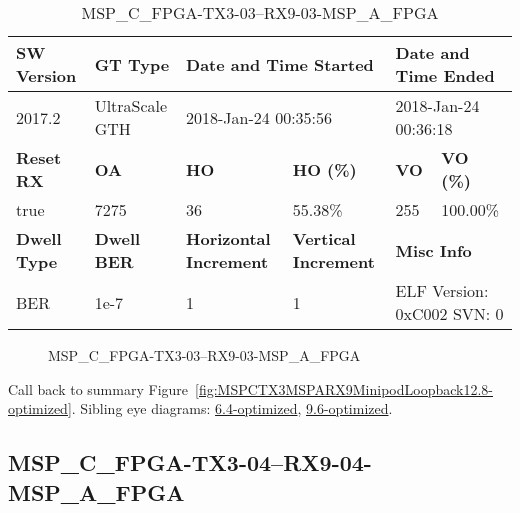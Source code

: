 \begin{table}[h]
\centering
\caption{MSP\_C\_FPGA-TX3-03--RX9-03-MSP\_A\_FPGA}
\label{tab:MSPCFPGATX303RX903MSPAFPGA12.8-optimized}
\begin{tabular}{@{}|l|l|l|l|l|l|@{}}
\toprule
\textbf{SW Version}                & \textbf{GT Type}   & \multicolumn{2}{l|}{\textbf{Date and Time Started}}            & \multicolumn{2}{l|}{\textbf{Date and Time Ended}}        \\ \midrule
2017.2                       & UltraScale GTH          & \multicolumn{2}{l|}{2018-Jan-24 00:35:56}                   & \multicolumn{2}{l|}{2018-Jan-24 00:36:18}               \\ \midrule
\textbf{Reset RX}                  & \textbf{OA} & \textbf{HO}   & \textbf{HO (\%)} & \textbf{VO} & \textbf{VO (\%)} \\ \midrule
true & 7275        & 36          & 55.38\%        & 255        & 100.00\%       \\ \midrule
\textbf{Dwell Type}                & \textbf{Dwell BER} & \textbf{Horizontal Increment} & \textbf{Vertical Increment}    & \multicolumn{2}{l|}{\textbf{Misc Info}}                  \\ \midrule
BER                            & 1e-7        & 1        & 1           & \multicolumn{2}{l|}{ELF Version: 0xC002 SVN: 0}                         \\ \bottomrule
\end{tabular}
\end{table}

\begin{figure}[h]
\caption{MSP\_C\_FPGA-TX3-03--RX9-03-MSP\_A\_FPGA} \label{fig:MSPCFPGATX303RX903MSPAFPGA12.8-optimized}
\end{figure}

Call back to summary Figure~\ref{fig:MSPCTX3MSPARX9MinipodLoopback12.8-optimized}.
Sibling eye diagrams: \hyperref[sec:MSPCFPGATX303RX903MSPAFPGA6.4-optimized]{6.4-optimized}, \hyperref[sec:MSPCFPGATX303RX903MSPAFPGA9.6-optimized]{9.6-optimized}.

\clearpage
\newpage


\subsection{MSP\_C\_FPGA-TX3-04--RX9-04-MSP\_A\_FPGA}\label{sec:MSPCFPGATX304RX904MSPAFPGA12.8-optimized}

